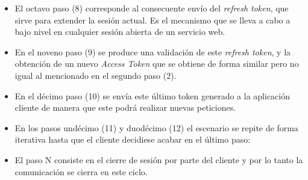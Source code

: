 \begin{itemize}
	\item El octavo paso (8) corresponde al consecuente envío del \textit{refresh token}, que sirve para extender la sesión actual. Es el mecanismo que se lleva a cabo a bajo nivel en cualquier sesión abierta de un servicio web.
	
	\item En el noveno paso (9) se produce una validación de este \textit{refresh token}, y la obtención de un nuevo \textit{Access Token} que se obtiene de forma similar pero no igual al mencionado en el segundo paso (2). 
	
	\item En el décimo paso (10) se envía este último token generado a la aplicación cliente de manera que este podrá realizar nuevas peticiones. 
	
	\item En los pasos undécimo (11) y duodécimo (12) el escenario se repite de forma
	iterativa hasta que el cliente decidiese acabar en el último paso: 
	
	\item El paso N consiste en el cierre de sesión por parte del cliente y por lo tanto la comunicación se cierra en este ciclo. 
	
\end{itemize}
